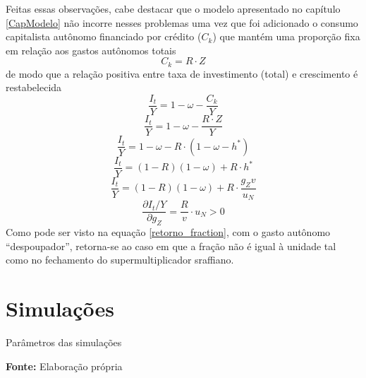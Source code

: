 Feitas essas observações, cabe destacar que o modelo apresentado no capítulo \ref{CapModelo} não incorre nesses problemas uma vez que foi adicionado o consumo capitalista autônomo financiado por crédito ($C_k$) que mantém uma proporção fixa em relação aos gastos autônomos totais
$$
C_k =  R \cdot Z
$$
de modo que a relação positiva entre taxa de investimento (total) e crescimento é restabelecida
$$
\frac{I_t}{Y} = 1 -  \omega - \frac{C_k}{Y}
$$
\begin{equation}
\label{retorno_fraction}
\frac{I_t}{Y} = 1 -  \omega - \frac{ R\cdot Z}{Y}
\end{equation}
$$
\frac{I_t}{Y} = 1 -  \omega -  R \cdot (1 -  \omega - h^*)
$$
$$
\frac{I_t}{Y} = (1-R)(1 -  \omega) +  R \cdot h^*
$$
$$
\frac{I_t}{Y} = (1-R)(1 -  \omega) +  R \cdot \frac{g_Z v}{u_N}
$$
$$
\frac{\partial I_t/Y}{\partial g_Z} = \frac{R}{v}\cdot u_N > 0
$$
Como pode ser visto na equação \ref{retorno_fraction}, com o gasto autônomo ``despoupador'', retorna-se ao caso em que a fração não é igual à unidade tal como no fechamento do supermultiplicador sraffiano. 

\section{Simulações}


\begin{table}[H]
	\centering
	\caption{Parâmetros das simulações}
	\label{Resumo_Simulacao}
	
	\caption*{\textbf{Fonte:} Elaboração própria}
\end{table}